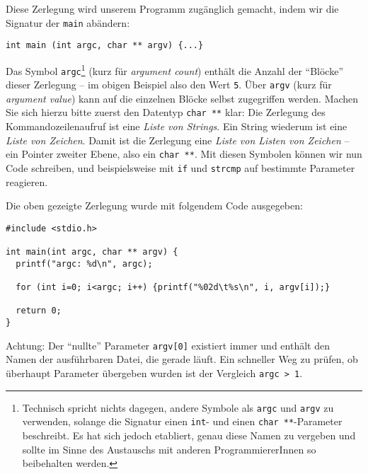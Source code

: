 Diese Zerlegung wird unserem Programm zugänglich gemacht, indem wir die Signatur der \texttt{main} abändern:
\begin{codebox}
\begin{verbatim}
int main (int argc, char ** argv) {...}
\end{verbatim}
\end{codebox}

Das Symbol \texttt{argc}\footnote{Technisch spricht nichts dagegen, andere Symbole als \texttt{argc} und \texttt{argv} zu verwenden, solange die Signatur einen \texttt{int}- und einen \texttt{char **}-Parameter beschreibt. Es hat sich jedoch etabliert, genau diese Namen zu vergeben und sollte im Sinne des Austauschs mit anderen ProgrammiererInnen so beibehalten werden.} (kurz für \emph{argument count}) enthält die Anzahl der \enquote{Blöcke} dieser Zerlegung -- im obigen Beispiel also den Wert \texttt{5}. Über \texttt{argv} (kurz für \emph{argument value}) kann auf die einzelnen Blöcke selbst zugegriffen werden. Machen Sie sich hierzu bitte zuerst den Datentyp \texttt{char **} klar: Die Zerlegung des Kommandozeilenaufruf ist eine \emph{Liste von Strings}. Ein String wiederum ist eine \emph{Liste von Zeichen}. Damit ist die Zerlegung eine \emph{Liste von Listen von Zeichen} -- ein Pointer zweiter Ebene, also ein \texttt{char **}. Mit diesen Symbolen können wir nun Code schreiben, und beispielsweise mit \texttt{if} und \texttt{strcmp} auf bestimmte Parameter reagieren.

Die oben gezeigte Zerlegung wurde mit folgendem Code ausgegeben:
\begin{codebox}
\begin{verbatim}
#include <stdio.h>

int main(int argc, char ** argv) {
  printf("argc: %d\n", argc);

  for (int i=0; i<argc; i++) {printf("%02d\t%s\n", i, argv[i]);}

  return 0;
}
\end{verbatim}
\end{codebox}

\begin{hintbox}
Achtung: Der \enquote{nullte} Parameter \texttt{argv[0]} existiert immer und enthält den Namen der ausführbaren Datei, die gerade läuft.
Ein schneller Weg zu prüfen, ob überhaupt Parameter übergeben wurden ist der Vergleich \texttt{argc > 1}.
\end{hintbox}

